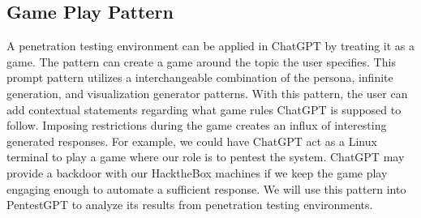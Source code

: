 \documentclass[conference]{IEEEtran}
\begin{document}
\subsection{Game Play Pattern} \label{ssec:gameplay}
A penetration testing environment can be applied in ChatGPT by treating it as a game. The pattern can create a game around the topic the user specifies. This prompt pattern utilizes a interchangeable combination of the persona, infinite generation, and visualization generator patterns\cite{white2023prompt}. With this pattern, the user can add contextual statements regarding what game rules ChatGPT is supposed to follow. Imposing restrictions during the game creates an influx of interesting generated responses. For example, we could have ChatGPT act as a Linux terminal to play a game where our role is to pentest the system. ChatGPT may provide a backdoor with our HacktheBox machines if we keep the game play engaging enough to automate a sufficient response. We will use this pattern into PentestGPT to analyze its results from penetration testing environments.




\vspace{12pt}
\end{document}
